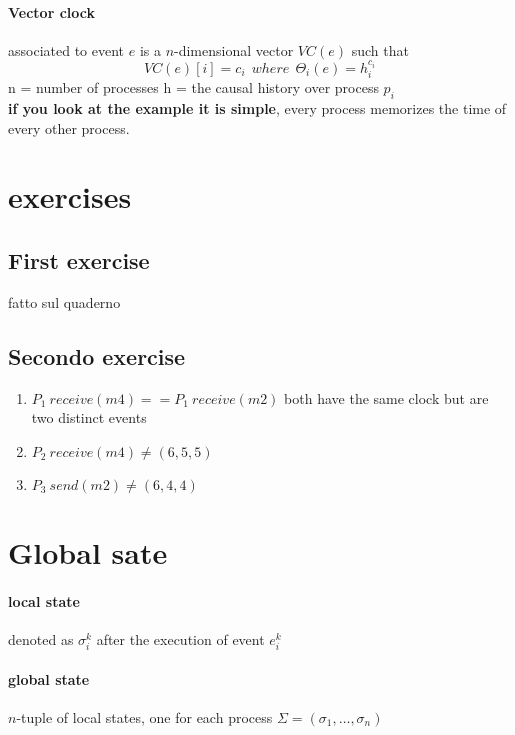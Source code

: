 \documentclass[11pt]{article}
\begin{document}
\paragraph{Vector clock} %
\label{par:vector_clock}
associated to event $e$ is a $n$-dimensional vector $VC(e)$ such that
\[
	VC(e)[i] = c_i \ \ where\ \ \Theta_i(e) = h^{c_i}_i
\]
n = number of processes
h = the causal history over process $p_i$ \\

\textbf{if you look at the example it is simple}, every process memorizes the time of every other process. 

\section{exercises} %
\label{sec:exercises}
\subsection{First exercise} %
\label{sub:first_exercise}
fatto sul quaderno
\subsection{Secondo exercise} %
\label{sub:secondo_exercise}
\begin{enumerate}
	\item $P_1 \ receive(m4) == P_1 \ receive(m2) $ both have the same clock but are two distinct events
	\item $P_2 \ receive(m4) \neq (6,5,5)$
	\item $P_3 \ send(m2) \neq (6,4,4)$
\end{enumerate}


\section{Global sate} %
\label{sec:global_sate}
\paragraph{local state} %
\label{par:local_state}
denoted as $\sigma^k_i$ after the execution of event $e^k_i$
\paragraph{global state} %
\label{par:global_state}
$n$-tuple of local states, one for each process $\Sigma = (\sigma_1, \ldots, \sigma_n)$
\end{document}
